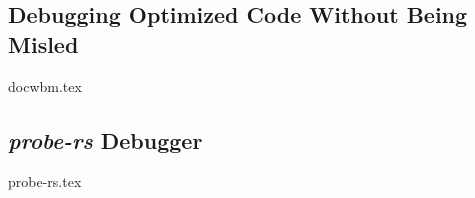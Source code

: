 


\subsection{Debugging Optimized Code Without Being Misled}
{docwbm.tex}


\subsection{\emph{probe-rs} Debugger}
{probe-rs.tex}


%
%
%
%
%

